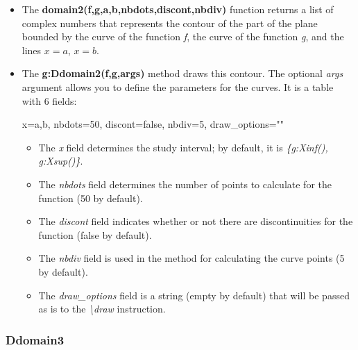 \begin{itemize}
    \item The \textbf{domain2(f,g,a,b,nbdots,discont,nbdiv)} function returns a list of complex numbers that represents the contour of the part of the plane bounded by the curve of the function \emph{f}, the curve of the function \emph{g}, and the lines \(x=a\), \(x=b\).

    \item The \textbf{g:Ddomain2(f,g,args)} method draws this contour. The optional \emph{args} argument allows you to define the parameters for the curves. It is a table with 6 fields:

\begin{TeXcode}
{ x={a,b}, nbdots=50, discont=false, nbdiv=5, draw_options="" }
\end{TeXcode}

\begin{itemize}
    \item The \emph{x} field determines the study interval; by default, it is \emph{\{g:Xinf(), g:Xsup()\}}.
    \item The \emph{nbdots} field determines the number of points to calculate for the function (50 by default).
    \item The \emph{discont} field indicates whether or not there are discontinuities for the function (false by default).     \item The \emph{nbdiv} field is used in the method for calculating the curve points (5 by default).
    \item The \emph{draw\_options} field is a string (empty by default) that will be passed as is to the \emph{\textbackslash draw} instruction.
\end{itemize}
\end{itemize}

\subsubsection{Ddomain3}

